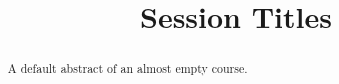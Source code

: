 \documentclass{xourse}
\title{Session Titles}
\begin{document}
\begin{abstract}
    A default abstract of an almost empty course.
\end{abstract}
\maketitle


\end{document}
